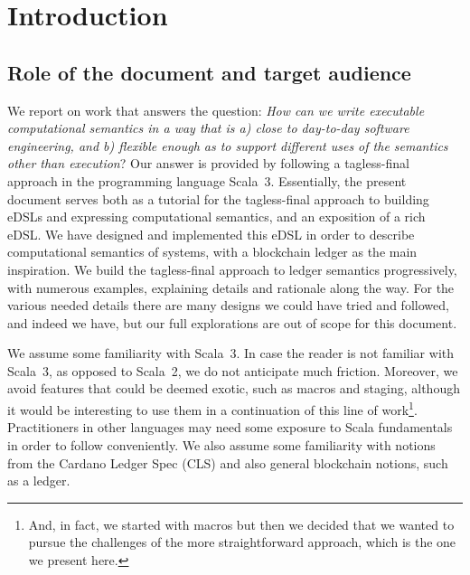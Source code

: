 \documentclass[11pt]{article}
\begin{document}
\clearpage
\tableofcontents

\section{Introduction}
\label{sec:intro}

\subsection{Role of the document and target audience}
We report on work that answers the question: \textit{How can we write executable computational semantics in a way that is a) close to day-to-day software engineering, and b) flexible enough as to support different uses of the semantics other than execution}? Our answer is provided by following a tagless-final approach \cite{tf:main:2009,tf:lecture:2012} in the programming language Scala~3.
Essentially, the present document serves both as a tutorial for the tagless-final approach to building eDSLs and expressing computational semantics, and an exposition of a rich eDSL. We have designed and implemented this eDSL in order to describe computational semantics of systems, with a blockchain ledger as the main inspiration. We build the tagless-final approach to ledger semantics progressively, with numerous examples, explaining details and rationale along the way. For the various needed details there are many designs we could have tried and followed, and indeed we have, but our full explorations are out of scope for this document.

We assume some familiarity with Scala~3. In case the reader is not familiar with Scala~3, as opposed to Scala~2, we do not anticipate much friction. Moreover, we avoid features that could be deemed exotic, such as macros and staging, although it would be interesting to use them in a continuation of this line of work\footnote{And, in fact, we started with macros but then we decided that we wanted to pursue the challenges of the more straightforward approach, which is the one we present here.}. Practitioners in other languages may need some exposure to Scala fundamentals in order to follow conveniently. We also assume some familiarity with notions from the Cardano Ledger Spec (CLS) \cite{cardano:ledger-spec:shelley:2019} and also general blockchain notions, such as a ledger.
\end{document}
